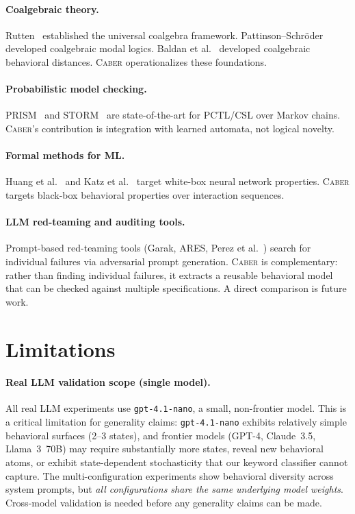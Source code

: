 \documentclass[11pt]{article}
\newcommand{\tool}{\textsc{Caber}}
\begin{document}
\paragraph{Coalgebraic theory.}
Rutten~\cite{rutten2000universal} established the universal coalgebra
framework.  Pattinson--Schr\"oder~\cite{pattinson2008coalgebraic}
developed coalgebraic modal logics.
Baldan et al.~\cite{baldan2018coalgebraic} developed coalgebraic
behavioral distances.  \tool{} operationalizes these foundations.

\paragraph{Probabilistic model checking.}
PRISM~\cite{kwiatkowska2011prism} and STORM~\cite{hensel2022storm} are
state-of-the-art for PCTL/CSL over Markov chains.  \tool{}'s
contribution is integration with learned automata, not logical novelty.

\paragraph{Formal methods for ML.}
Huang et al.~\cite{huang2017safety} and Katz et
al.~\cite{katz2017reluplex} target white-box neural network properties.
\tool{} targets black-box behavioral properties over interaction sequences.

\paragraph{LLM red-teaming and auditing tools.}
Prompt-based red-teaming tools (Garak, ARES, Perez et
al.~\cite{perez2022red}) search for individual failures via
adversarial prompt generation.  \tool{} is complementary: rather than
finding individual failures, it extracts a reusable behavioral model
that can be checked against multiple specifications.  A direct
comparison is future work.

\section{Limitations}\label{sec:limitations}

\paragraph{Real LLM validation scope (single model).}
All real LLM experiments use \texttt{gpt-4.1-nano}, a small,
non-frontier model.  This is a critical limitation for generality
claims: \texttt{gpt-4.1-nano} exhibits relatively simple behavioral
surfaces (2--3 states), and frontier models (GPT-4, Claude~3.5,
Llama~3~70B) may require substantially more states, reveal
new behavioral atoms, or exhibit state-dependent stochasticity
that our keyword classifier cannot capture.  The multi-configuration
experiments show behavioral diversity across system prompts, but
\emph{all configurations share the same underlying model weights}.
Cross-model validation is needed before any generality claims can
be made.
\end{document}
